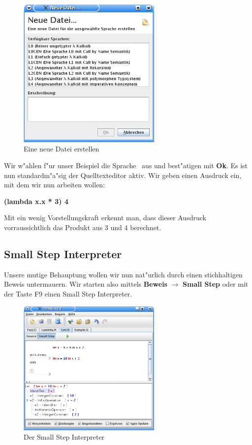\begin{figure}[h]
\begin{center}
\includegraphics[width=7cm]{images/new-dialog.png}
\caption{Eine neue Datei erstellen}
\end{center}
\end{figure}

Wir w"ahlen f"ur unser Beispiel die Sprache \LONE\ aus und best"atigen
mit {\bf Ok}. Es ist nun standardm"a"sig der Quelltexteditor aktiv.
Wir geben einen Ausdruck ein, mit dem wir nun arbeiten wollen:

{\bf (lambda x.x * 3) 4}

Mit ein wenig Vorstellungskraft erkennt man, dass dieser Ausdruck
vorraussichtlich das Produkt aus 3 und 4 berechnet.


\subsection{Small Step Interpreter}
Unsere mutige Behauptung wollen wir nun nat"urlich durch einen
stichhaltigen Beweis untermauern. Wir starten also mittels {\bf
Beweis} $\rightarrow$ {\bf Small Step} oder mit der Taste F9 einen
Small Step Interpreter.

\begin{figure}[h]
\begin{center}
\includegraphics[width=7cm]{images/small-step.png}
\caption{Der Small Step Interpreter}
\label{FigureSmallStep}
\end{center}
\end{figure}

